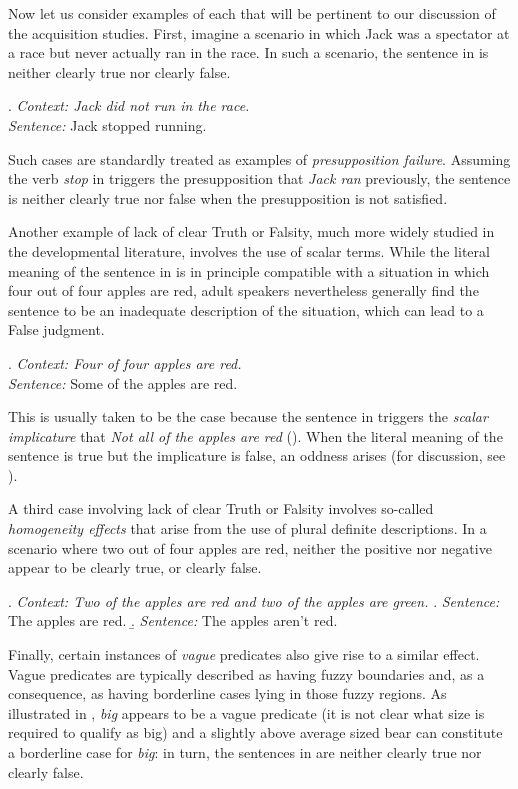 \documentclass[12pt, letterpaper]{article}
\begin{document}
Now let us consider examples of each that will be pertinent to our discussion of the acquisition studies. First, imagine a scenario in which Jack was a spectator at a race but never actually ran in the race. In such a scenario, the sentence in \Next is neither clearly true nor clearly false.

\ex. \label{presup} \textit{Context: Jack did not run in the race.} \\
\textit{Sentence:} Jack stopped running.

Such cases are standardly treated as examples of \textit{presupposition failure}. Assuming the verb \textit{stop} in \Last triggers the presupposition that \textit{Jack ran} previously, the sentence is neither clearly true nor false when the presupposition is not satisfied. 

Another example of lack of clear Truth or Falsity, much more widely studied in the developmental literature, involves the use of scalar terms. While the literal meaning of the sentence in \Next is in principle compatible with a situation in which four out of four apples are red, adult speakers nevertheless generally find the sentence to be an inadequate description of the situation, which can lead to a False judgment.

\ex. \label{si} \textit{Context: Four of four apples are red.} \\
\textit{Sentence:} Some of the apples are red.

This is usually taken to be the case because the sentence in \Last triggers the \textit{scalar implicature} that \textit{Not all of the apples are red} (\citealt{Grice:1975}). When the literal meaning of the sentence is true but the implicature is false, an oddness arises (for discussion, see \citealt{Magri:2009,Magri:2014}). 

A third case involving lack of clear Truth or Falsity involves so-called \textit{homogeneity effects} that arise from the use of plural definite descriptions. In a scenario where two out of four apples are red, neither the positive \Next[a] nor negative \Next[b] appear to be clearly true, or clearly false.

\ex. \label{hmg} \textit{Context: Two of the apples are red and two of the apples are green.} 
\a. \textit{Sentence:} The apples are red.
\b. \textit{Sentence:} The apples aren't red.

Finally, certain instances of \textit{vague} predicates also give rise to a similar effect. Vague predicates are typically described as having fuzzy boundaries and, as a consequence, as having borderline cases lying in those fuzzy regions. As illustrated in \Next, \textit{big} appears to be a vague predicate (it is not clear what size is required to qualify as big) and a slightly above average sized bear can constitute a borderline case for \textit{big}: in turn, the sentences in \Next are neither clearly true nor clearly false.
\end{document}
